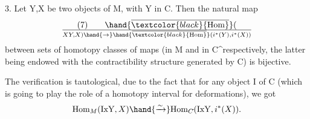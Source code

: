 \hand{\uline{\textcolor{black}{Lemma}}} 3. Let Y,X be two objects of M, with Y in C. Then the natural map
\[ (7) \qquad \hand{\overline{\textcolor{black}{\mathrm{Hom}}}}(\over{X}{Y},X) \hand{\to} \hand{\overline{\textcolor{black}{\mathrm{Hom}}}}(i^*(Y),i^*(X)) \]
between sets of homotopy classes of maps (in M and in C\^{}respectively, the
latter being endowed with the contractibility structure generated by C)
is bijective.

The verification is tautological, due to the fact that for any
object I of C (which is going to play the role of a homotopy interval for
deformations), we got
\[ \mathrm{Hom}_M(\mathrm{IxY},X) \hand{\xrightarrow{\sim}} \mathrm{Hom}_{C\hat{}}(\mathrm{IxY},i^*(X)). \]

